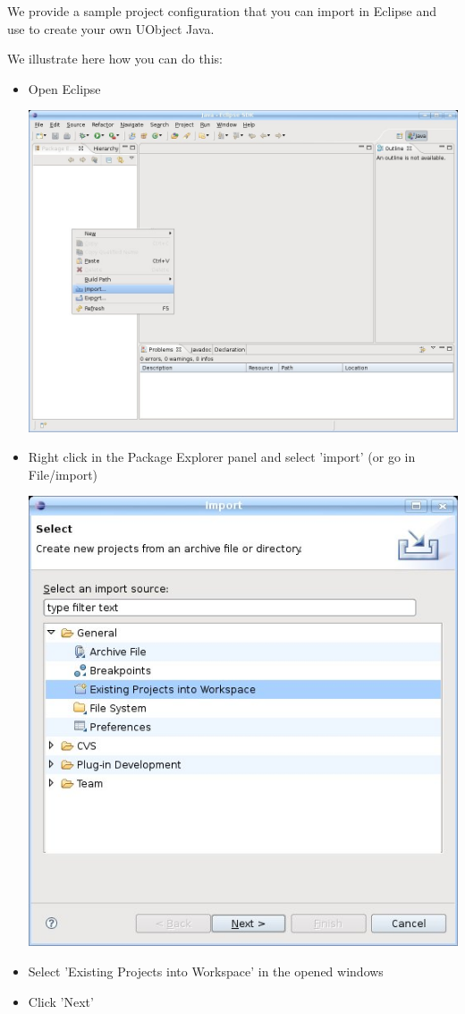 We provide a sample  project configuration that
you can import in Eclipse and use to create your own UObject Java.

We illustrate here how you can do this:

\begin{itemize}
\item Open Eclipse

\begin{center}
  \includegraphics[width=0.6\linewidth]{img/eclipse-import}
\end{center}

\item Right click in the Package Explorer panel and select 'import' (or go in File/import)

\begin{center}
  \includegraphics[width=0.6\linewidth]{img/select-import}
\end{center}

\item Select 'Existing Projects into Workspace' in the opened windows
\item Click 'Next'


\end{itemize}

